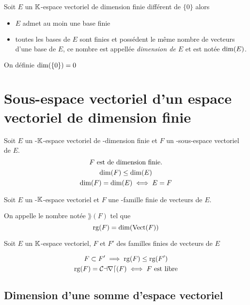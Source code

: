 \begin{thm}
Soit $E$ un $\mathbb{K}$-espace vectoriel de dimension finie différent de
$\{0\}$ alors
\begin{itemize}
    \item $E$ admet au moin une base finie
    \item toutes les bases de $E$ sont finies et possédent le même nombre
    de vecteurs d'une base de $E$, ce nombre est appellée 
    \emph{dimension de $E$} et est notée $\operatorname{dim}(E)$.
\end{itemize}
On définie $\operatorname{dim}(\{0\}) = 0$
\end{thm}


\section{Sous-espace vectoriel d'un espace vectoriel de dimension finie}

\begin{prp}
Soit $E$ un \hyp{$\mathbb{K}$-espace vectoriel} de \hyp{dimension finie} et $F$
un \hyp{sous-espace vectoriel de $E$}.
\begin{gather*}
    F \text{ est de dimension finie.} \\
    \operatorname{dim}(F) \leq \operatorname{dim}(E) \\
    \operatorname{dim}(F) = \operatorname{dim}(E) \iff E = F
\end{gather*}
\end{prp}

\begin{dfn}
Soit $E$ un \hyp{$\mathbb{K}$-espace vectoriel} et $F$ une \hyp{famille finie de
vecteurs de $E$}.

On appelle  le nombre notée $\rang(F)$ tel que
\[
    \operatorname{rg}(F) = \operatorname{dim}(\operatorname{Vect}(F))
\]
\end{dfn}

\begin{prp}
Soit $E$ un $\mathbb{K}$-espace vectoriel, $F$ et $F'$ des familles finies
de vecteurs de $E$

\begin{gather*}
    F \subset F' \implies \operatorname{rg}(F) \leq \operatorname{rg}(F') \\
    \operatorname{rg}(F) = \operatorname{\mathcal{Card}}(F) \iff F \text{ est libre}
\end{gather*}
\end{prp}


\subsection{Dimension d'une somme d'espace vectoriel}

